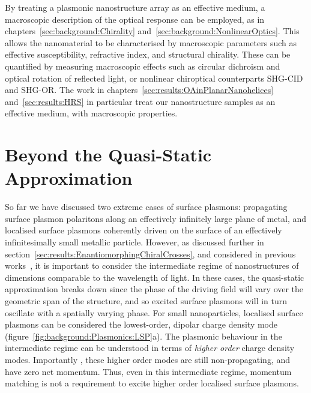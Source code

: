 By treating a plasmonic nanostructure array as an effective medium, a macroscopic description of the optical response can be employed, as in chapters~\ref{sec:background:Chirality} and~\ref{sec:background:NonlinearOptics}. This allows the nanomaterial to be characterised by macroscopic parameters such as effective susceptibility, refractive index, and structural chirality. These can be quantified by measuring macroscopic effects such as circular dichroism and optical rotation of reflected light, or nonlinear chiroptical counterparts SHG-CID and SHG-OR. The work in chapters~\ref{sec:results:OAinPlanarNanohelices} and~\ref{sec:results:HRS} in particular treat our nanostructure samples as an effective medium, with macroscopic properties.

\section{Beyond the Quasi-Static Approximation}\label{sec:background:Plasmonics:Intermediate}
So far we have discussed two extreme cases of surface plasmons: propagating surface plasmon polaritons along an effectively infinitely large plane of metal, and localised surface plasmons coherently driven on the surface of an effectively infinitesimally small metallic particle. However, as discussed further in section~\ref{sec:results:EnantiomorphingChiralCrosses}, and considered in previous works~\cite{Valev2011b, Valev2014}, it is important to consider the intermediate regime of nanostructures of dimensions comparable to the wavelength of light. In these cases, the quasi-static approximation breaks down since the phase of the driving field will vary over the geometric span of the structure, and so excited surface plasmons will in turn oscillate with a spatially varying phase. For small nanoparticles, localised surface plasmons can be considered the lowest-order, dipolar charge density mode (figure~\ref{fig:background:Plasmonics:LSP}a). The plasmonic behaviour in the intermediate regime can be understood in terms of \textit{higher order} charge density modes. Importantly , these higher order modes are still non-propagating, and have zero net momentum. Thus, even in this intermediate regime, momentum matching is not a requirement to excite higher order localised surface plasmons.
